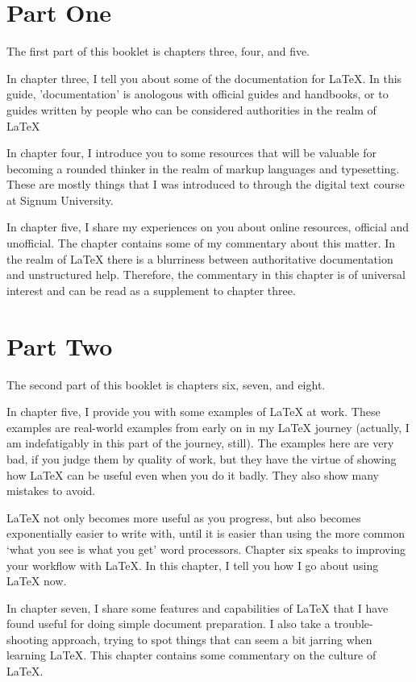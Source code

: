 \documentclass[12pt, oneside]{memoir}
\begin{document}
\section{Part One}
The first part of this booklet is chapters three, four, and five.

In chapter three, I tell you about some of the documentation for \LaTeX{}. In this guide, 'documentation' is anologous with official guides and handbooks, or to guides written by people who can be considered authorities in the realm of \LaTeX{}

In chapter four, I introduce you to some resources that will be valuable for becoming a rounded thinker in the realm of markup languages and typesetting. These are mostly things that I was introduced to through the digital text course at Signum University.

In chapter five, I share my experiences on you about online resources, official and unofficial. The chapter contains some of my commentary about this matter. In the realm of \LaTeX{} there is a blurriness between authoritative documentation and unstructured help. Therefore, the commentary in this chapter is of universal interest and can be read as a supplement to chapter three.

\section{Part Two}
The second part of this booklet is chapters six, seven, and eight.

In chapter five, I provide you with some examples of \LaTeX{} at work. These examples are real-world examples from early on in my \LaTeX{} journey (actually, I am indefatigably in this part of the journey, still). The examples here are very bad, if you judge them by quality of work, but they have the virtue of showing how \LaTeX{} can be useful even when you do it badly. They also show many mistakes to avoid.

\LaTeX{} not only becomes more useful as you progress, but also becomes exponentially easier to write with, until it is easier than using the more common `what you see is what you get' word processors. Chapter six speaks to improving your workflow with \LaTeX{}. In this chapter, I tell you how I go about using \LaTeX{} now.

In chapter seven, I share some features and capabilities of \LaTeX{} that I have found useful for doing simple document preparation. I also take a trouble-shooting approach, trying to spot things that can seem a bit jarring when learning \LaTeX{}. This chapter contains some commentary on the culture of \LaTeX{}.
\end{document}
